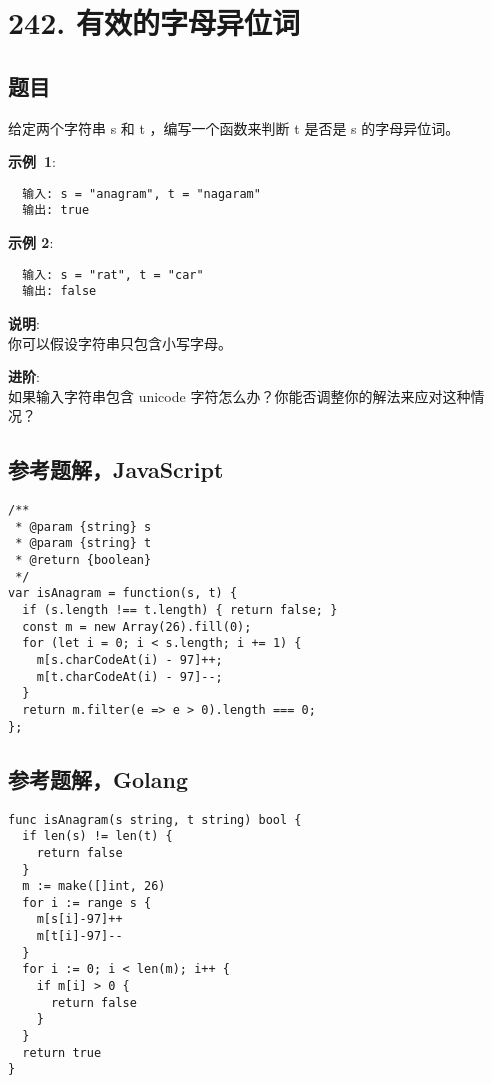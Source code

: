 \newpage
\section{242. 有效的字母异位词}
\label{leetcode:242}

\subsection{题目}

给定两个字符串 s 和 t ，编写一个函数来判断 t 是否是 s 的字母异位词。

\textbf{示例 1}:

\begin{verbatim}
  输入: s = "anagram", t = "nagaram"
  输出: true
\end{verbatim}

\textbf{示例 2}:

\begin{verbatim}
  输入: s = "rat", t = "car"
  输出: false
\end{verbatim}

\textbf{说明}:\\
你可以假设字符串只包含小写字母。

\textbf{进阶}:\\
如果输入字符串包含 unicode 字符怎么办？你能否调整你的解法来应对这种情况？

\subsection{参考题解，JavaScript}

\begin{verbatim}
/**
 * @param {string} s
 * @param {string} t
 * @return {boolean}
 */
var isAnagram = function(s, t) {
  if (s.length !== t.length) { return false; }
  const m = new Array(26).fill(0);
  for (let i = 0; i < s.length; i += 1) {
    m[s.charCodeAt(i) - 97]++;
    m[t.charCodeAt(i) - 97]--;
  }
  return m.filter(e => e > 0).length === 0;
};
\end{verbatim}

\subsection{参考题解，Golang}

\begin{verbatim}
func isAnagram(s string, t string) bool {
  if len(s) != len(t) {
    return false
  }
  m := make([]int, 26)
  for i := range s {
    m[s[i]-97]++
    m[t[i]-97]--
  }
  for i := 0; i < len(m); i++ {
    if m[i] > 0 {
      return false
    }
  }
  return true
}
\end{verbatim}

